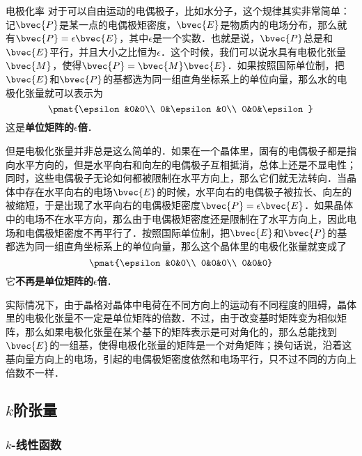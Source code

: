 \begin{example}{电极化率}
对于可以自由运动的电偶极子，比如水分子，这个规律其实非常简单：记$\bvec{P}$是某一点的电偶极矩密度，$\bvec{E}$是物质内的电场分布，那么就有$\bvec{P}=\epsilon\bvec{E}$，其中$\epsilon$是一个实数．也就是说，$\bvec{P}$总是和$\bvec{E}$平行，并且大小之比恒为$\epsilon$．这个时候，我们可以说水具有电极化张量$\bvec{M}$，使得$\bvec{P}=\bvec{M}\bvec{E}$．如果按照国际单位制，把$\bvec{E}$和$\bvec{P}$的基都选为同一组直角坐标系上的单位向量，那么水的电极化张量就可以表示为
\begin{equation}
\pmat{\epsilon&0&0\\ 0&\epsilon&0\\ 0&0&\epsilon}
\end{equation}
这是\textbf{单位矩阵的$\epsilon$倍}．

但是电极化张量并非总是这么简单的．如果在一个晶体里，固有的电偶极子都是指向水平方向的，但是水平向右和向左的电偶极子互相抵消，总体上还是不显电性；同时，这些电偶极子无论如何都被限制在水平方向上，那么它们就无法转向．当晶体中存在水平向右的电场$\bvec{E}$的时候，水平向右的电偶极子被拉长、向左的被缩短，于是出现了水平向右的电偶极矩密度$\bvec{P}=\epsilon\bvec{E}$．如果晶体中的电场不在水平方向，那么由于电偶极矩密度还是限制在了水平方向上，因此电场和电偶极矩密度不再平行了．按照国际单位制，把$\bvec{E}$和$\bvec{P}$的基都选为同一组直角坐标系上的单位向量，那么这个晶体里的电极化张量就变成了
\begin{equation}
\pmat{\epsilon&0&0\\ 0&0&0\\ 0&0&0}
\end{equation}
它\textbf{不再是单位矩阵的$\epsilon$倍}．

实际情况下，由于晶格对晶体中电荷在不同方向上的运动有不同程度的阻碍，晶体里的电极化张量不一定是单位矩阵的倍数．不过，由于改变基时矩阵变为相似矩阵，那么如果电极化张量在某个基下的矩阵表示是可对角化的，那么总能找到$\bvec{E}$的一组基，使得电极化张量的矩阵是一个对角矩阵；换句话说，沿着这基向量方向上的电场，引起的电偶极矩密度依然和电场平行，只不过不同的方向上倍数不一样．

\end{example}


\subsection{$k$阶张量}

\subsubsection{$k$-线性函数}


